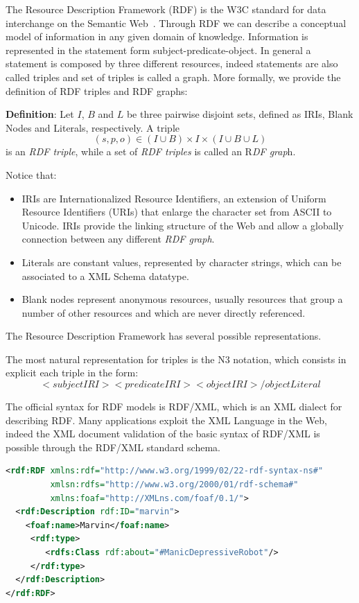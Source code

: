 The Resource Description Framework (RDF) is the W3C standard for data interchange on the Semantic Web~\cite{rdfconcepts}. Through RDF we can describe a conceptual model of information in any given domain of knowledge. Information is represented in the statement form subject-predicate-object. In general a statement is composed by three different resources, indeed statements are also called triples and set of triples is called a graph. More formally, we provide the definition of RDF triples and RDF graphs:

\textbf{Definition}: Let $I$, $B$ and $L$ be three pairwise disjoint sets, defined as IRIs, Blank Nodes and Literals, respectively. A triple \[ (s, p, o) \in (I \cup B) × I × (I \cup B \cup L) \] is  an \textit{RDF triple}, while a set of \textit{RDF triples} is called an R\textit{DF grap}h.

Notice that:
\begin{itemize}
\item IRIs are Internationalized Resource Identifiers, an extension of Uniform Resource Identifiers (URIs) that enlarge the character set from ASCII to Unicode.  IRIs provide the linking structure of the Web and allow a globally connection between any different \textit{RDF graph}.
\item Literals are constant values, represented by character strings, which can be associated to a XML Schema datatype. 
\item Blank nodes represent anonymous resources, usually resources that group a number of other resources and which are never directly referenced.
\end{itemize}

The Resource Description Framework has several possible representations.

The most natural representation for triples is the N3 notation, which consists in explicit each triple in the form:
 \[<subjectIRI> <predicateIRI> <objectIRI>/objectLiteral\]
 
The official syntax for RDF models is RDF/XML, which is an XML dialect for describing RDF. Many applications exploit the XML Language in the Web, indeed the XML document validation of the basic syntax of RDF/XML is possible through the RDF/XML standard schema. 

\begin{lstlisting}[language=XML, caption=An example of a simple RDF/XML document:, label=code:rdf]
<rdf:RDF xmlns:rdf="http://www.w3.org/1999/02/22-rdf-syntax-ns#"
 		 xmlsn:rdfs="http://www.w3.org/2000/01/rdf-schema#"
 		 xmlns:foaf="http://XMLns.com/foaf/0.1/">
  <rdf:Description rdf:ID="marvin">
    <foaf:name>Marvin</foaf:name>
     <rdf:type>
        <rdfs:Class rdf:about="#ManicDepressiveRobot"/>
     </rdf:type>
  </rdf:Description>
</rdf:RDF>
\end{lstlisting}

